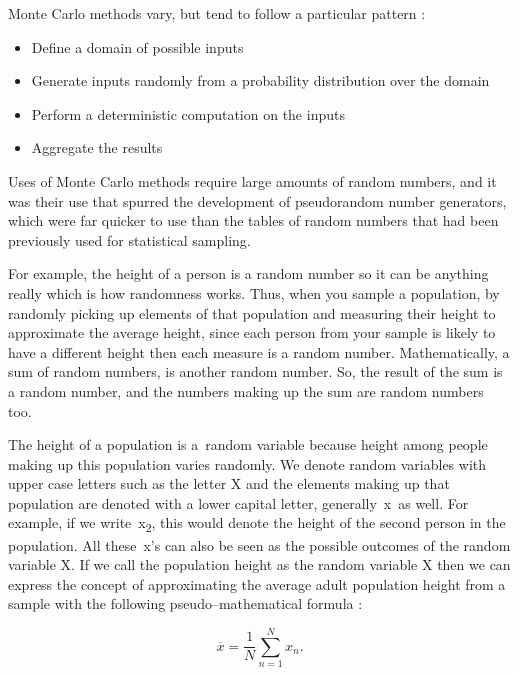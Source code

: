 \documentclass[12pt,a4paper]{report}
\numberwithin{equation}{section}
\begin{document}
Monte Carlo methods vary, but tend to follow a particular pattern
\cite{kalos2008monte_42}:

\begin{itemize}
\item
  Define a domain of possible inputs
\item
  Generate inputs randomly from a probability distribution over the
  domain
\item
  Perform a deterministic computation on the inputs
\item
  Aggregate the results
\end{itemize}

Uses of Monte Carlo methods require large amounts of random numbers, and
it was their use that spurred the development of pseudorandom number
generators, which were far quicker to use than the tables of random
numbers that had been previously used for statistical sampling.

For example, the height of a person is a random number so it can be
anything really which is how randomness works. Thus, when you sample a
population, by randomly picking up elements of that population and
measuring their height to approximate the average height, since each
person from your sample is likely to have a different height then each
measure is a random number. Mathematically, a sum of random numbers, is
another random number. So, the result of the sum is a random number, and
the numbers making up the sum are random numbers too.

The height of a population is a~random variable because height among
people making up this population varies randomly. We denote random
variables with upper case letters such as the letter X and the elements
making up that population are denoted with a lower capital letter,
generally~x~as well. For example, if we write~x\textsubscript{2}, this
would denote the height of the second person in the population. All
these~x's can also be seen as the possible outcomes of the random
variable X. If we call the population height as the random variable X
then we can express the concept of approximating the average adult
population height from a sample with the following pseudo--mathematical
formula \cite{deisenroth2021mathematics_43}:

\begin{equation}
\overline{x} = \frac{1}{N}\sum_{n=1}^{N} x_n.
\label{eq:sample-mean}
\end{equation}
\end{document}
